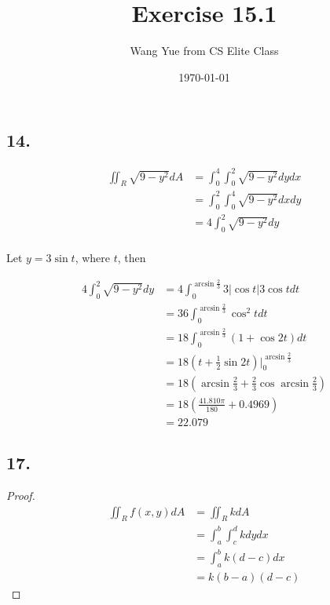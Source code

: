 \documentclass{article}
\begin{document}
  \title{Exercise 15.1}
  \author{Wang Yue from CS Elite Class}
  \date{\today}
  \maketitle


  \subsection*{14. }

  $$\begin{aligned}
    \iint_R \sqrt{9-y^2}dA &= \int_0^4 \int_0^2 \sqrt{9-y^2} dy dx \\
    &= \int_0^2 \int_0^4 \sqrt{9-y^2} dx dy \\
    &= 4\int_0^2 \sqrt{9-y^2} dy \\
  \end{aligned}$$

  Let $y = 3 \sin t$, where $t$, then

  $$\begin{aligned}
    4\int_0^2 \sqrt{9-y^2} dy &= 4\int_0^{\arcsin \frac 2 3} 3 |\cos t| 3\cos t dt \\
    &= 36\int_0^{\arcsin \frac 2 3} \cos^2 t dt \\
    &= 18\int_0^{\arcsin \frac 2 3} (1 + \cos 2t)dt \\
    &= 18(t + \frac 1 2 \sin 2t)\biggl|_0^{\arcsin \frac 2 3} \\
    &= 18(\arcsin \frac 2 3 + \frac 2 3 \cos \arcsin \frac 2 3) \\
    &= 18(\frac{41.810\pi}{180} + 0.4969) \\
    &= 22.079
  \end{aligned}$$

  \subsection*{17. }

  \begin{proof}
    $$\begin{aligned}
      \iint_R f(x, y)dA &= \iint_R k dA \\
      &= \int_a^b \int_c^d k dy dx \\
      &= \int_a^b k(d - c) dx \\
      &= k(b-a)(d-c)
    \end{aligned}$$
  \end{proof}
\end{document}
